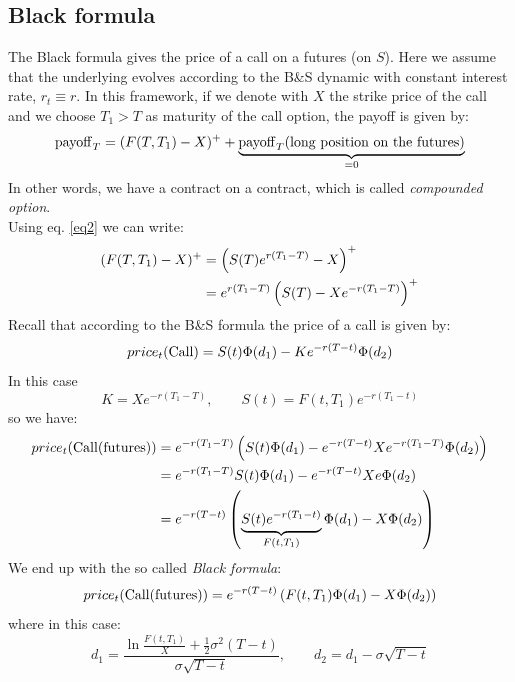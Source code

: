 \subsection{Black formula} %
The Black formula gives the price of a call on a futures (on $S$). Here we assume that the underlying evolves according to the B\&S dynamic with constant interest rate, $r_t \equiv r$. In this framework, if we denote with $X$ the strike price of the call and we choose $T_1 > T$ as maturity of the call option, the payoff is given by:
\begin{equation}
    \operatorname{payoff}_T = (F(T,T_1) - X)^+ + \underbrace{\operatorname{payoff}_T(\text{long position on the futures})}_{=0}
\end{equation} 
In other words, we have a contract on a contract, which is called \emph{compounded option}. \\
Using eq. \eqref{eq2} we can write:
\begin{align}
    \notag (F(T,T_1) - X)^+ &= \left(S(T)e^{r(T_1-T)} - X\right)^+ \\
    &=
    e^{r(T_1-T)}\left(S(T)-Xe^{-r(T_1-T)}\right)^+
\end{align}
Recall that according to the B\&S formula the price of a call is given by:
\begin{equation*}
    price_t(\operatorname{Call}) = S(t)\Phi(d_1)-Ke^{-r(T-t)}\Phi(d_2)
\end{equation*}
In this case 
\begin{equation*}
    K = Xe^{-r(T_1-T)}, \qquad S(t) = F(t,T_1)e^{-r(T_1-t)} 
\end{equation*}
so we have:
\begin{align*}
    price_t(\operatorname{Call}(\operatorname{futures})) &= e^{-r(T_1-T)} \left(S(t)\Phi(d_1)-e^{-r(T-t)}Xe^{-r(T_1-T)}\Phi(d_2)\right) \\
    &=
    e^{-r(T_1-T)}S(t)\Phi(d_1)-e^{-r(T-t)}Xe\Phi(d_2) \\
    &=
    e^{-r(T-t)}\left(\underbrace{S(t)e^{-r(T_1-t)}}_{F(t,T_1)}\Phi(d_1) - X\Phi(d_2)\right) 
\end{align*}
We end up with the so called \emph{Black formula}:
\begin{equation}
    price_t(\operatorname{Call}(\operatorname{futures})) = e^{-r(T-t)}\left(F(t,T_1)\Phi(d_1) - X\Phi(d_2)\right)
\end{equation}
where in this case:
\begin{equation}
    d_1 = \dfrac{\ln\frac{F(t,T_1)}{X}+\frac{1}{2}\sigma^2(T-t)}{\sigma\sqrt{T-t}}, \qquad d_2 = d_1 - \sigma\sqrt{T-t} %
\end{equation}


